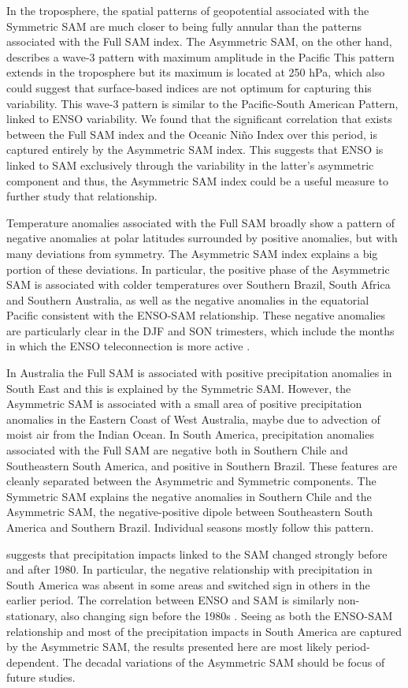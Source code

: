 \documentclass[smallextended]{svjour3}       %
\begin{document}
In the troposphere, the spatial patterns of geopotential associated with the Symmetric SAM are much closer to being fully annular than the patterns associated with the Full SAM index. The Asymmetric SAM, on the other hand, describes a wave-3 pattern with maximum amplitude in the Pacific This pattern extends in the troposphere but its maximum is located at 250 hPa, which also could suggest that surface-based indices are not optimum for capturing this variability. This wave-3 pattern is similar to the Pacific-South American Pattern, linked to ENSO variability. We found that the significant correlation that exists between the Full SAM index and the Oceanic Niño Index over this period, is captured entirely by the Asymmetric SAM index. This suggests that ENSO is linked to SAM exclusively through the variability in the latter's asymmetric component and thus, the Asymmetric SAM index could be a useful measure to further study that relationship.

Temperature anomalies associated with the Full SAM broadly show a pattern of negative anomalies at polar latitudes surrounded by positive anomalies, but with many deviations from symmetry. The Asymmetric SAM index explains a big portion of these deviations. In particular, the positive phase of the Asymmetric SAM is associated with colder temperatures over Southern Brazil, South Africa and Southern Australia, as well as the negative anomalies in the equatorial Pacific consistent with the ENSO-SAM relationship. These negative anomalies are particularly clear in the DJF and SON trimesters, which include the months in which the ENSO teleconnection is more active \citep[e.g.][]{cai2020a}.

In Australia the Full SAM is associated with positive precipitation anomalies in South East and this is explained by the Symmetric SAM. However, the Asymmetric SAM is associated with a small area of positive precipitation anomalies in the Eastern Coast of West Australia, maybe due to advection of moist air from the Indian Ocean. In South America, precipitation anomalies associated with the Full SAM are negative both in Southern Chile and Southeastern South America, and positive in Southern Brazil. These features are cleanly separated between the Asymmetric and Symmetric components. The Symmetric SAM explains the negative anomalies in Southern Chile and the Asymmetric SAM, the negative-positive dipole between Southeastern South America and Southern Brazil. Individual seasons mostly follow this pattern.

\citet{silvestri2009} suggests that precipitation impacts linked to the SAM changed strongly before and after 1980. In particular, the negative relationship with precipitation in South America was absent in some areas and switched sign in others in the earlier period. The correlation between ENSO and SAM is similarly non-stationary, also changing sign before the 1980s \citep{fogt2006, clem2013}. Seeing as both the ENSO-SAM relationship and most of the precipitation impacts in South America are captured by the Asymmetric SAM, the results presented here are most likely period-dependent. The decadal variations of the Asymmetric SAM should be focus of future studies.
\end{document}

